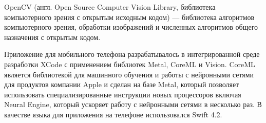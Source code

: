 OpenCV (англ. Open Source Computer Vision Library, библиотека компьютерного зрения с открытым исходным кодом) — библиотека алгоритмов компьютерного зрения, обработки изображений и численных алгоритмов общего назначения с открытым кодом.

Приложение для мобильного телефона разрабатывалось в интегрированной среде разработки XCode с применением библиотек Metal, CoreML и Vision. CoreML является библиотекой для машинного обучения и работы с нейронными сетями для продуктов компании Apple и сделан на базе Metal, который позволяет использовать специализированные инструкции новых процессоров включая Neural Engine, который ускоряет работу с нейронными сетями в несколько раз. В качестве языка для приложения на телефоне использовался Swift 4.2. 